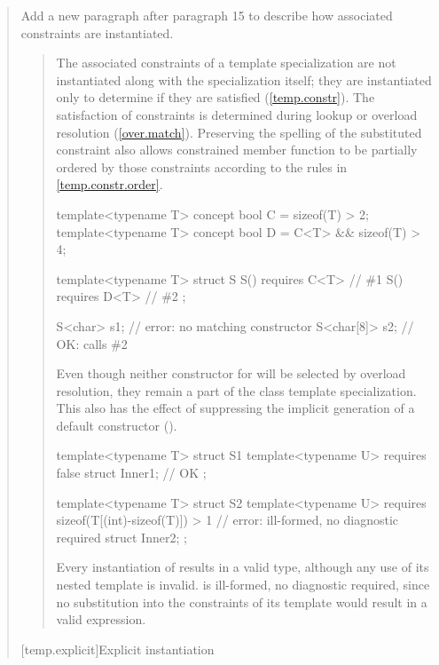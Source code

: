 \begin{quote}
Add a new paragraph after paragraph 15 to describe how associated
constraints are instantiated.

\begin{quote}
\begin{addedblock}
\setcounter{Paras}{15}
\pnum
The associated constraints of a template specialization are not
instantiated along with the specialization itself; they are
instantiated only to determine if they are satisfied
(\ref{temp.constr}).
% 
\enternote
The satisfaction of constraints is determined during lookup or overload
resolution (\ref{over.match}). Preserving the spelling
of the substituted constraint also allows constrained member function
to be partially ordered by those constraints according to the rules
in \ref{temp.constr.order}.
\exitnote
% 
\enterexample
\begin{codeblock}
template<typename T> concept bool C = sizeof(T) > 2;
template<typename T> concept bool D = C<T> && sizeof(T) > 4;

template<typename T> struct S {
  S() requires C<T> { } // \#1
  S() requires D<T> { } // \#2
};

S<char> s1;    // error: no matching constructor
S<char[8]> s2; // OK: calls \#2
\end{codeblock}

Even though neither constructor for  will be selected by
overload resolution, they remain a part of the class template specialization. 
% 
This also has the effect of suppressing the implicit generation of a default
constructor ().
\exitexample

\enterexample
\begin{codeblock}
template<typename T> struct S1 {
  template<typename U> requires false struct Inner1; // OK
};

template<typename T> struct S2 {
  template<typename U> 
    requires sizeof(T[(int)-sizeof(T)]) > 1 // error: ill-formed, no diagnostic required
      struct Inner2;
};
\end{codeblock}
\exitexample
Every instantiation of  results in a valid type, although any use 
of its nested  template is invalid.
% 
 is ill-formed, no diagnostic required, since no substitution into 
the constraints of its  template would result in a valid 
expression.
\end{addedblock}
\end{quote}


[temp.explicit]{Explicit instantiation}


\end{quote}

